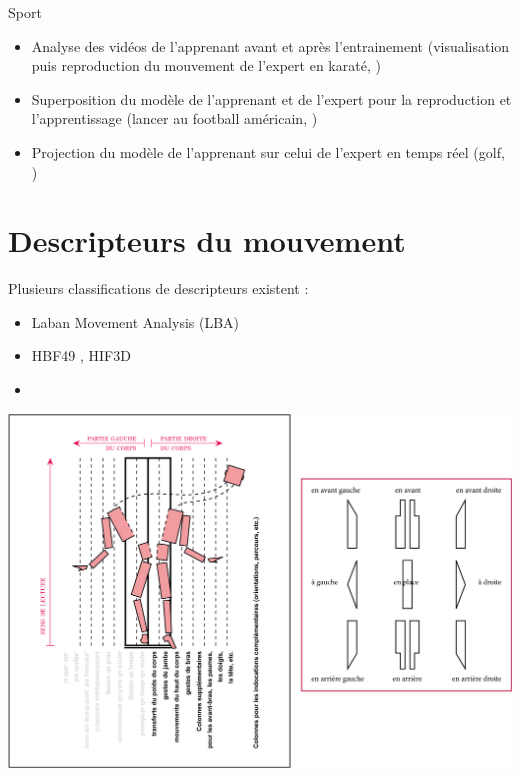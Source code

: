     \begin{frame}{\subsecname}
        \begin{block}{Sport}
            \begin{itemize}[label=$\bullet$]
                \item Analyse des vidéos de l'apprenant avant et après l'entrainement (visualisation puis reproduction du mouvement de l'expert en karaté, )
                \item Superposition du modèle de l'apprenant et de l'expert pour la reproduction et l'apprentissage (lancer au football américain, )
                \item Projection du modèle de l'apprenant sur celui de l'expert en temps réel (golf, )
                
            \end{itemize}
        \end{block}
    \end{frame}
    
    \section{Descripteurs du mouvement} 
    
    \begin{frame}{\subsecname}
        Plusieurs classifications de descripteurs existent :
        \begin{itemize}[label=$\bullet$]
            \item Laban Movement Analysis (LBA)
            \item HBF49 , HIF3D 
            \item 
        \end{itemize}
        
        \centering
        \includegraphics[scale=0.15]{img/laban_2.png}
    \end{frame}
    
